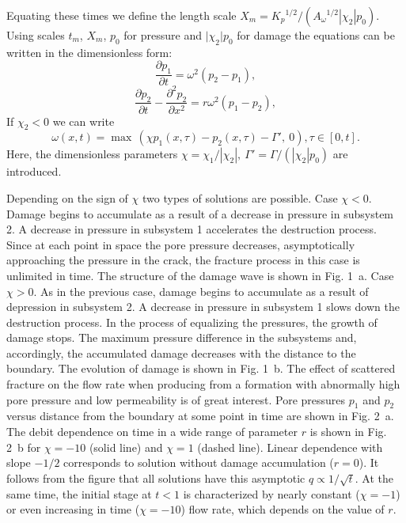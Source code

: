\documentclass[article,authoryear,jpm]{beg_39}             %
\begin{document}
Equating these times we define the length scale ${{X}_{m}}={{K}_{p}}^{1/2}/({{A}_{\omega }}^{1/2}{|{\chi }_{2}|}{{p}_{0}})$. Using scales ${t}_{m}$,  ${X}_{m}$, $p_0$ for pressure and ${|\chi }_{2}|{{p}_{0}}$ for damage the equations can be written in the dimensionless form:
\begin{equation}
\frac{\partial {{p}_{1}}}{\partial t}={{\omega }^{2}}({{p}_{2}}-{{p}_{1}}),
\end{equation}
\begin{equation}
\frac{\partial {{p}_{2}}}{\partial t}-\frac{{{\partial }^{2}}{{p}_{2}}}{\partial {{x}^{2}}}=r{{\omega }^{2}}({{p}_{1}}-{{p}_{2}}),
\end{equation}
If ${{\chi}_{2}}< 0$ we can write
\begin{equation}
\omega (x,t)={\mathop{\max }}\,\left(  \chi {{p}_{1}}(x,\tau )-{{p}_{2}}(x,\tau )-{\Gamma }',\ 0 \right), \tau \in [0,t].
\end{equation}
Here, the dimensionless parameters $\chi ={{\chi }_{1}}/{|{\chi }_{2}|},\ {\Gamma }'=\Gamma /({|{\chi }_{2}|}{{p}_{0}})$ are introduced.

Depending on the sign of $\chi$ two types of solutions are possible.
Case $\chi<0$.
Damage begins to accumulate as a result of a decrease in pressure in subsystem 2.
A decrease in pressure in subsystem 1 accelerates the destruction process.
Since at each point in space the pore pressure decreases, asymptotically approaching the pressure in the crack, the fracture process in this case is unlimited in time.
The structure of the damage wave is shown in Fig. 1~a.
Case $\chi>0$.
As in the previous case, damage begins to accumulate as a result of depression in subsystem 2.
A decrease in pressure in subsystem 1 slows down the destruction process. In the process of equalizing the pressures, the growth of damage stops.
The maximum pressure difference in the subsystems and, accordingly, the accumulated damage decreases with the distance to the boundary.
The evolution of damage is shown in Fig. 1~b.
The effect of scattered fracture on the flow rate when producing from a formation with abnormally high pore pressure and low permeability is of great interest.
Pore pressures $p_1$ and $p_2$ versus distance from the boundary at some point in time are shown in Fig. 2~a.
The debit dependence on time in a wide range of parameter $r$ is shown in Fig. 2~b for $\chi=-10$ (solid line) and $\chi=1$ (dashed line).
Linear dependence with slope $-1/2$ corresponds to solution without damage accumulation ($r=0$). It follows from the figure that all solutions have this asymptotic $q \propto 1/\sqrt{t}$. At the same time, the initial stage at $t < 1$ is characterized by nearly constant ($\chi=-1$) or even increasing in time ($\chi=-10$) flow rate, which depends on the value of $r$.
\end{document}
